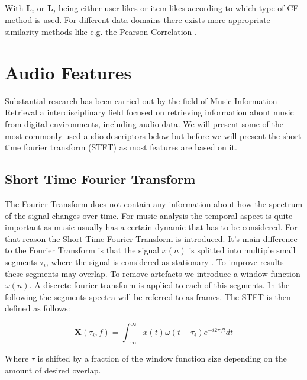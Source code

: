 \documentclass[cic,tc,english]{iiufrgs}
\begin{document}
With $\mathbf{L}_i$ or $\mathbf{L}_j$ being either user likes or item likes according to which type of CF method is used. For different data domains there exists more appropriate similarity methods like e.g. the Pearson Correlation \cite{ekstrand2011collaborative}.

\section{Audio Features}
Substantial research has been carried out by the field of Music Information Retrieval a interdisciplinary field focused on retrieving information about music from digital environments, including audio data. We will present some of the most commonly used audio descriptors below but before we will present the short time fourier transform (STFT) as most features are based on it.

\subsection{Short Time Fourier Transform} \label{section:STFT}
The Fourier Transform does not contain any information about how the spectrum of the signal changes over time. For music analysis the temporal aspect is quite important as music usually has a certain dynamic that has to be considered. For that reason the Short Time Fourier Transform is introduced. It's main difference to the Fourier Transform is that the signal $x(n)$ is splitted into multiple small segments $\tau_{i}$, where the signal is considered as stationary \cite{ohm2010signalubertragung}. To improve results these segments may overlap. To remove artefacts we introduce a window function $\omega(n)$. A discrete fourier transform is applied to each of this segments. In the following the segments spectra will be referred to as frames. The STFT is then defined as follows:

\begin{equation}
 \bm{X}(\tau_{i}, f) =  \int^{\infty}_{-\infty} x(t) \omega(t-\tau_{i})e^{-i2\pi ft}dt 
\end{equation}

Where $\tau$ is shifted by a fraction of the window function size depending on the amount of desired overlap. 
\end{document}

